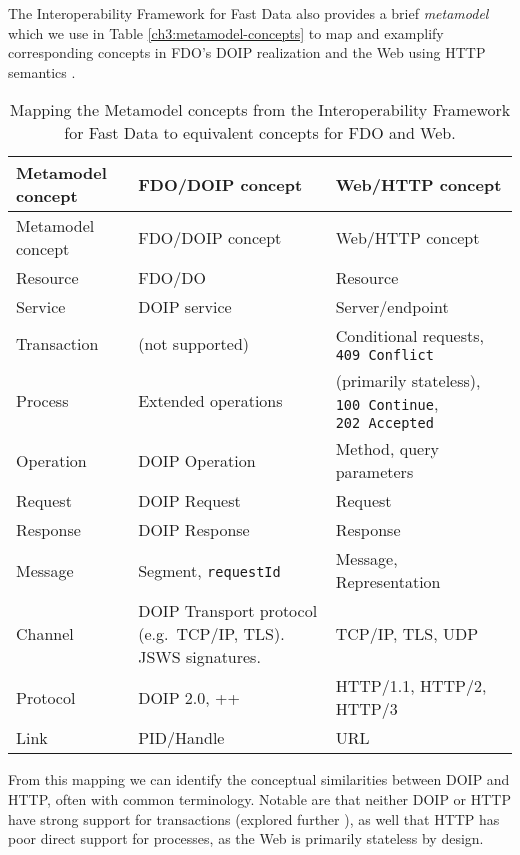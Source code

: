 The Interoperability Framework for Fast Data also provides a brief \emph{metamodel} which we use in Table \vref{ch3:metamodel-concepts} to map and examplify corresponding concepts in FDO's DOIP realization and the Web using HTTP semantics \cite{rfc9110}.

\begin{small}
\begin{longtable}[]{@{}
  >{\centering\arraybackslash}p{}
  >{\centering\arraybackslash}p{}
  >{\centering\arraybackslash}p{}@{}}
	\caption[Mapping the Metamodel concepts from the Interoperability Framework for Fast Data]{Mapping the Metamodel concepts from the Interoperability Framework for Fast Data \cite{delgadoInteroperabilityFrameworkDistributed2016a} to equivalent concepts for FDO and Web.
\label{ch3:metamodel-concepts}}\tabularnewline
\toprule
Metamodel concept & 
FDO/DOIP concept &
Web/HTTP concept \\
\midrule
\endfirsthead
\toprule
Metamodel concept & 
FDO/DOIP concept & 
Web/HTTP concept \\
\midrule
\endhead
Resource & FDO/DO & Resource \\
Service & DOIP service & Server/endpoint \\
Transaction & (not supported) & Conditional requests, \texttt{409\ Conflict} \\
Process & Extended operations & (primarily stateless), \texttt{100\ Continue}, \texttt{202\ Accepted} \\
Operation & DOIP Operation & Method, query parameters \\
Request & DOIP Request & Request \\
Response & DOIP Response & Response \\
Message & Segment, \texttt{requestId} & Message, Representation \\
Channel & DOIP Transport protocol (e.g.~TCP/IP, TLS). JSWS signatures. & TCP/IP, TLS, UDP \\
Protocol & DOIP 2.0, ++ & HTTP/1.1, HTTP/2, HTTP/3 \\
Link & PID/Handle & URL \\
\bottomrule
\end{longtable}
\end{small}

From this mapping we can identify the conceptual similarities between DOIP and HTTP, often with common terminology. Notable are that neither DOIP or HTTP have strong support for transactions (explored further ), as well that HTTP has poor direct support for processes, as the Web is primarily stateless by design.

